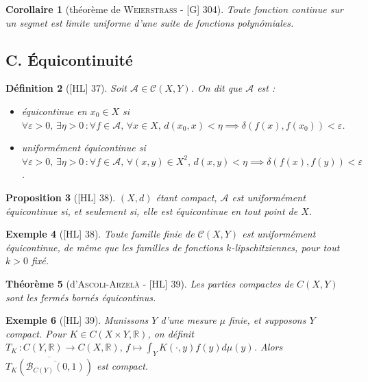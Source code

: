 \documentclass[10pt, a4paper, parskip=full, twoside, twocolumn]{report}
\newtheorem{definition}{Définition}
\newtheorem{theorem}[definition]{Théorème}
\newtheorem{proposition}[definition]{Proposition}
\newtheorem{corollary}[definition]{Corollaire}
\newtheorem{example}[definition]{Exemple}
\newcommand{\IR}{\mathbb{R}}
\newcommand{\B}{\mathcal{B}}
\newcommand{\A}{\mathcal{A}}
\begin{document}
\begin{corollary}[théorème de \textsc{Weierstrass} - \textnormal{[G] 304}]
	Toute fonction continue sur un segmet est limite uniforme d'une suite de fonctions polynômiales.
\end{corollary}

\subsection*{C. Équicontinuité}

\begin{definition}[\textnormal{[HL] 37}]
	Soit $\A\in\mathcal{C}(X,Y)$. On dit que $\A$ est :
	\begin{itemize}
		\item \emph{équicontinue en $x_0\in X$} si $\forall \varepsilon >0,\,\exists\eta >0\,\colon \forall f\in\A,\,\forall x\in X,\, d(x_0,x)<\eta\implies\delta(f(x), f(x_0))< \varepsilon$.
		\item \emph{uniformément équicontinue} si $\forall\varepsilon > 0,\,\exists \eta > 0\,\colon \forall f\in \A,\,\forall (x,y)\in X^2,\, d(x,y)< \eta\implies \delta(f(x),f(y))< \varepsilon$.
	\end{itemize}
\end{definition}

\begin{proposition}[\textnormal{[HL] 38}]
	$(X,d)$ étant compact, $\A$ est uniformément équicontinue si, et seulement si, elle est équicontinue en tout point de $X$.
\end{proposition}

\begin{example}[\textnormal{[HL] 38}]
	Toute famille finie de $\mathcal{C}(X,Y)$ est uniformément équicontinue, de même que les familles de fonctions $k$-lipschitziennes, pour tout $k> 0$ fixé.
\end{example}

\begin{theorem}[d'\textsc{Ascoli-Arzelà} - \textnormal{[HL] 39}]
	Les parties compactes de $C(X,Y)$ sont les fermés bornés équicontinus.
\end{theorem}

\begin{example}[\textnormal{[HL] 39}]
	Munissons $Y$ d'une mesure $\mu$ finie, et supposons $Y$ compact.
	Pour $K \in C(X\times Y,\IR)$, on définit $T_K\,\colon C(Y,\IR)\to C(X,\IR),\, f\mapsto \int_Y K(\cdot, y)f(y)d\mu(y)$.
	Alors $\overline{T_K(\overline{\B_{C(Y)}(0,1)})}$ est compact.
\end{example}
\end{document}
